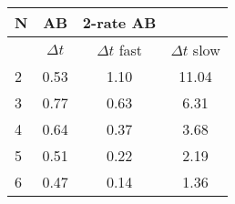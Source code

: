 \begin{tabular}{l|c|cc}
N & AB & 2-rate AB\\
\hline
 & $\Delta t$ & $\Delta t$ fast & $\Delta t$ slow\\
\hline
2 & 0.53& 1.10 & 11.04 \\
\hline
3 & 0.77& 0.63 & 6.31 \\
\hline
4 & 0.64& 0.37 & 3.68 \\
\hline
5 & 0.51& 0.22 & 2.19 \\
\hline
6 & 0.47& 0.14 & 1.36 \\
\hline
\end{tabular}
